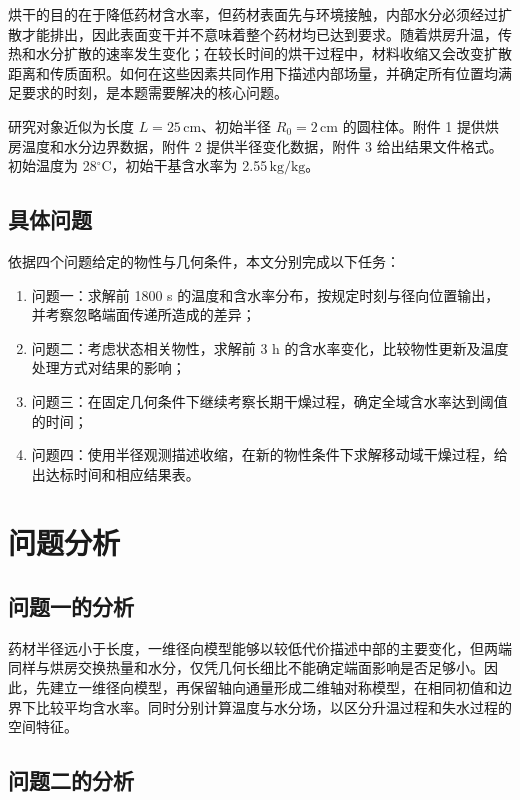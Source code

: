 \documentclass[withoutpreface,bwprint]{cumcmthesis}
\newcommand{\kgkg}{\ensuremath{\mathrm{kg/kg}}}
\begin{document}
烘干的目的在于降低药材含水率，但药材表面先与环境接触，内部水分必须经过扩散才能排出，因此表面变干并不意味着整个药材均已达到要求。随着烘房升温，传热和水分扩散的速率发生变化；在较长时间的烘干过程中，材料收缩又会改变扩散距离和传质面积。如何在这些因素共同作用下描述内部场量，并确定所有位置均满足要求的时刻，是本题需要解决的核心问题。

研究对象近似为长度 \(L=25\,\mathrm{cm}\)、初始半径 \(R_0=2\,\mathrm{cm}\) 的圆柱体。附件 1 提供烘房温度和水分边界数据，附件 2 提供半径变化数据，附件 3 给出结果文件格式。初始温度为 28\(^{\circ}\mathrm C\)，初始干基含水率为 2.55\,\kgkg。

\subsection{具体问题}

依据四个问题给定的物性与几何条件，本文分别完成以下任务：

\begin{enumerate}[label=(\arabic*)]
  \item 问题一：求解前 1800 s 的温度和含水率分布，按规定时刻与径向位置输出，并考察忽略端面传递所造成的差异；
  \item 问题二：考虑状态相关物性，求解前 3 h 的含水率变化，比较物性更新及温度处理方式对结果的影响；
  \item 问题三：在固定几何条件下继续考察长期干燥过程，确定全域含水率达到阈值的时间；
  \item 问题四：使用半径观测描述收缩，在新的物性条件下求解移动域干燥过程，给出达标时间和相应结果表。
\end{enumerate}

\section{问题分析}

\subsection{问题一的分析}

药材半径远小于长度，一维径向模型能够以较低代价描述中部的主要变化，但两端同样与烘房交换热量和水分，仅凭几何长细比不能确定端面影响是否足够小。因此，先建立一维径向模型，再保留轴向通量形成二维轴对称模型，在相同初值和边界下比较平均含水率。同时分别计算温度与水分场，以区分升温过程和失水过程的空间特征。

\subsection{问题二的分析}
\end{document}
